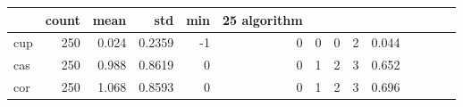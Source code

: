 \begin{tabular}{lrrrrrrrrr}
\toprule
 & count & mean & std & min & 25%
algorithm &  &  &  &  &  &  &  &  &  \\
\midrule
cup & 250 & 0.024 & 0.2359 & -1 & 0 & 0 & 0 & 2 & 0.044 \\
cas & 250 & 0.988 & 0.8619 & 0 & 0 & 1 & 2 & 3 & 0.652 \\
cor & 250 & 1.068 & 0.8593 & 0 & 0 & 1 & 2 & 3 & 0.696 \\
\bottomrule
\end{tabular}
